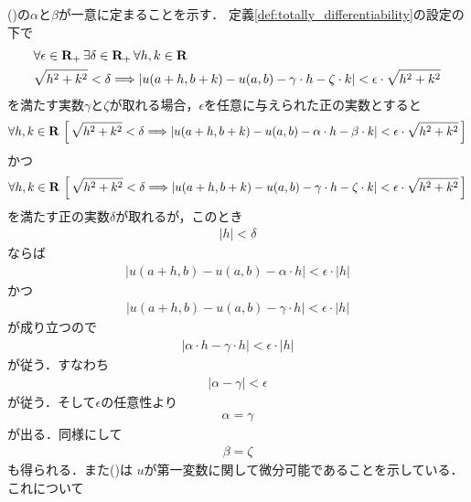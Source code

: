 	()の$\alpha$と$\beta$が一意に定まることを示す．
	定義\ref{def:totally_differentiability}の設定の下で
	\begin{align}
		&\forall \epsilon \in \mathbf{R}_+\, \exists \delta \in \mathbf{R}_+\, \forall h,k \in \mathbf{R}\, \\
		&\sqrt{h^2 + k^2} < \delta \Longrightarrow
		\left|u(a+h,b+k) - u(a,b) - \gamma \cdot h - \zeta \cdot k\right| 
		< \epsilon \cdot \sqrt{h^2 + k^2}
	\end{align}
	を満たす実数$\gamma$と$\zeta$が取れる場合，$\epsilon$を任意に与えられた正の実数とすると
	\begin{align}
		\forall h,k \in \mathbf{R}\,
		\left[\, \sqrt{h^2 + k^2} < \delta \Longrightarrow
		\left|u(a+h,b+k) - u(a,b) - \alpha \cdot h - \beta \cdot k\right| 
		< \epsilon \cdot \sqrt{h^2 + k^2}\, \right]
	\end{align}
	かつ
	\begin{align}
		\forall h,k \in \mathbf{R}\,
		\left[\, \sqrt{h^2 + k^2} < \delta \Longrightarrow
		\left|u(a+h,b+k) - u(a,b) - \gamma \cdot h - \zeta \cdot k\right| 
		< \epsilon \cdot \sqrt{h^2 + k^2}\, \right]
	\end{align}
	を満たす正の実数$\delta$が取れるが，このとき
	\begin{align}
		|h| < \delta
	\end{align}
	ならば
	\begin{align}
		\left|u(a+h,b) - u(a,b) - \alpha \cdot h\right| < \epsilon \cdot |h|
		\label{fom:totally_differentiable_then_partially_differentiable}
	\end{align}
	かつ
	\begin{align}
		\left|u(a+h,b) - u(a,b) - \gamma \cdot h\right| < \epsilon \cdot |h|
	\end{align}
	が成り立つので
	\begin{align}
		\left|\alpha \cdot h - \gamma \cdot h\right| < \epsilon \cdot |h|
	\end{align}
	が従う．すなわち
	\begin{align}
		\left|\alpha - \gamma\right| < \epsilon
	\end{align}
	が従う．そして$\epsilon$の任意性より
	\begin{align}
		\alpha = \gamma
	\end{align}
	が出る．同様にして
	\begin{align}
		\beta = \zeta
	\end{align}
	も得られる．また()は
	$u$が第一変数に関して微分可能であることを示している．これについて
	
